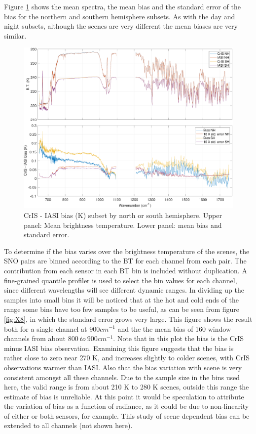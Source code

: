 \documentclass[twocolumn,10pt]{article}
\begin{document}
Figure \ref{fig:X7} shows the mean spectra, the mean bias and the standard error of the bias for the northern and southern hemisphere subsets.
As with the day and night subsets, although the scenes are very different the mean biases are
very similar.

\begin{figure}[htb]
  \centering          \includegraphics[width=\linewidth]{./figs/ic_jpl_sno_north_south_bias_stderr_lw_mw.pdf}
  \caption{CrIS - IASI bias (K) subset by north or south hemisphere. Upper panel: Mean brightness temperature. Lower panel: mean bias and standard error.}
  \label{fig:X7}
\end{figure}


To determine if the bias varies over the brightness temperature of the scenes, the SNO pairs are binned according to the BT for each channel from each pair. The contribution from each sensor in each BT bin is included without duplication.  A fine-grained quantile profiler is used to select the bin values for each channel, since different wavelengths will see different dynamic ranges.  In dividing up the samples into small bins it will be noticed that at the hot and cold ends of the range some bins have too few samples to be useful, as can be seen from figure \ref{fig:X8}, in which the standard error grows very large. This figure shows the result both for a single channel at $900 cm^{-1}$ and the the mean bias of 160 window channels from about $800\ to\ 900 cm^{-1}$. Note that in this plot the bias is the CrIS minus IASI bias observation. Examining this figure suggests that the bias is rather close to zero near 270 K, and increases slightly to colder scenes, with CrIS observations warmer than IASI. Also that the bias variation with scene
is very consistent amongst all these channels. Due to the sample size in the bins used here, the valid range is from about 210 K to 280 K scenes, outside this range the estimate of bias is unreliable.
At this point it would be speculation to attribute the variation of bias as a function of radiance, as it could be due to non-linearity of either or both sensors, for example. This study of scene dependent bias can be extended to all channels (not shown here).
\end{document}
